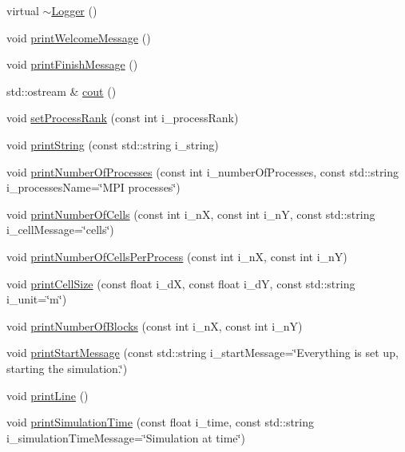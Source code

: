 \begin{DoxyCompactItemize}
\item 
virtual \hyperlink{classtools_1_1Logger_a58f170bf361ba7ceb3a4e0d9ec36bdf5}{$\sim$\-Logger} ()
\item 
void \hyperlink{classtools_1_1Logger_af45e7a1b4e9c33ab9fbb43e18e284eae}{print\-Welcome\-Message} ()
\item 
void \hyperlink{classtools_1_1Logger_a539d6f7c8e60c0ee887912c92c1dfa5c}{print\-Finish\-Message} ()
\item 
std\-::ostream \& \hyperlink{classtools_1_1Logger_ab0d82d23125a3d5d8b737984e678f43a}{cout} ()
\item 
void \hyperlink{classtools_1_1Logger_a1d3e0fcc3cb4c58eb486ac3fe14d30b0}{set\-Process\-Rank} (const int i\-\_\-process\-Rank)
\item 
void \hyperlink{classtools_1_1Logger_a9642689522ece27ca9c908f24f290134}{print\-String} (const std\-::string i\-\_\-string)
\item 
void \hyperlink{classtools_1_1Logger_a89b9dfd5340a4e18d7b8f1225d996730}{print\-Number\-Of\-Processes} (const int i\-\_\-number\-Of\-Processes, const std\-::string i\-\_\-processes\-Name=\char`\"{}M\-P\-I processes\char`\"{})
\item 
void \hyperlink{classtools_1_1Logger_a2da0a6c575304e91bea546dddc94f72d}{print\-Number\-Of\-Cells} (const int i\-\_\-n\-X, const int i\-\_\-n\-Y, const std\-::string i\-\_\-cell\-Message=\char`\"{}cells\char`\"{})
\item 
void \hyperlink{classtools_1_1Logger_acf2b4547c8b138e4e8e338002687a149}{print\-Number\-Of\-Cells\-Per\-Process} (const int i\-\_\-n\-X, const int i\-\_\-n\-Y)
\item 
void \hyperlink{classtools_1_1Logger_a4c81063c055f072c465853d6da85743b}{print\-Cell\-Size} (const float i\-\_\-d\-X, const float i\-\_\-d\-Y, const std\-::string i\-\_\-unit=\char`\"{}m\char`\"{})
\item 
void \hyperlink{classtools_1_1Logger_a6c71eab182524a84037eb6fe1ac42e9e}{print\-Number\-Of\-Blocks} (const int i\-\_\-n\-X, const int i\-\_\-n\-Y)
\item 
void \hyperlink{classtools_1_1Logger_a2d54396c65885248374009cb3b18c2da}{print\-Start\-Message} (const std\-::string i\-\_\-start\-Message=\char`\"{}Everything is set up, starting the simulation.\char`\"{})
\item 
void \hyperlink{classtools_1_1Logger_a44dee698c8d5c209ecac5a76047cdb90}{print\-Line} ()
\item 
void \hyperlink{classtools_1_1Logger_ac829729cc06f2a6e43f0272ada747685}{print\-Simulation\-Time} (const float i\-\_\-time, const std\-::string i\-\_\-simulation\-Time\-Message=\char`\"{}Simulation at time\char`\"{})

\end{DoxyCompactItemize}
